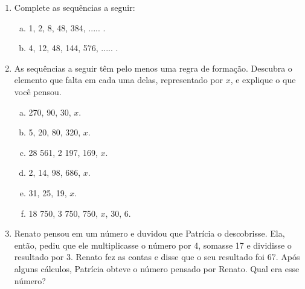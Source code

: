 \documentclass[a4paper,14pt]{article}
\begin{document}
\begin{multicols}{2}
\begin{enumerate}
    			\item Complete as sequências a seguir:
    			\begin{enumerate}[a)]
    				\item 1, 2, 8, 48, 384, ..... .
    				\item 4, 12, 48, 144, 576, ..... .
    			\end{enumerate}
    			\item As sequências a seguir têm pelo menos uma regra de formação. Descubra o elemento que falta em cada uma delas, representado por $x$, e explique o que você pensou.
    			\begin{enumerate}[a)]
    				\item 270, 90, 30, $x$.
    				\item 5, 20, 80, 320, $x$.
    				\item 28 561, 2 197, 169, $x$.
    				\item 2, 14, 98, 686, $x$.
    				\item 31, 25, 19, $x$.
    				\item 18 750, 3 750, 750, $x$, 30, 6.
    			\end{enumerate}
    			\item Renato pensou em um número e duvidou que Patrícia o descobrisse. Ela, então, pediu que ele multiplicasse o número por 4, somasse 17 e dividisse o resultado por 3. Renato fez as contas e disse que o seu resultado foi 67. Após alguns cálculos, Patrícia obteve o número pensado por Renato. Qual era esse número?
        	\end{enumerate}
        	$~$ \\ $~$ \\ $~$ \\ $~$ \\ $~$ \\ $~$ \\ $~$ \\ $~$ \\ $~$ \\ $~$ \\ $~$ \\ $~$ \\ $~$ 
	\end{multicols}
\end{document}
